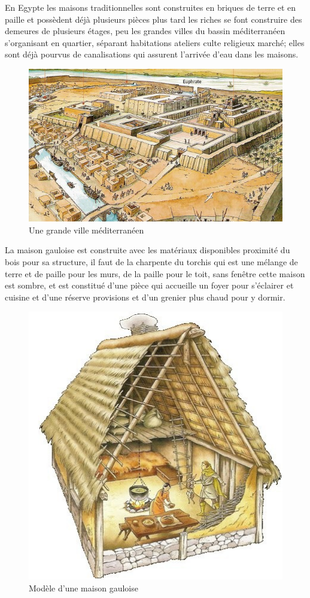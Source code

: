 En Egypte les maisons traditionnelles sont construites en briques de terre et en paille et possèdent déjà  plusieurs pièces plus tard les riches se font construire des demeures de plusieurs étages, peu les grandes villes du bassin méditerranéen s'organisant en quartier, séparant  habitations ateliers culte religieux marché; elles sont déjà pourvus de canalisations qui assurent l'arrivée d'eau dans les maisons.

\begin{figure}[H]
    \centering
    \includegraphics[scale=0.8]{chap1/chap34.png}
   \caption{Une grande ville  méditerranéen}
    \label{chap34}
\end{figure}

La maison gauloise est construite avec les matériaux disponibles proximité du bois pour sa structure, il faut de la charpente du torchis qui est une mélange de terre et de paille pour les murs, de la paille pour le toit, sans fenêtre cette maison est sombre, et est constitué d'une pièce qui accueille un foyer pour s'éclairer et cuisine et d'une réserve  provisions et d'un grenier plus chaud pour y dormir.


\begin{figure}[H]
    \centering
    \includegraphics[scale=0.7]{chap1/chap35.png}
   \caption{Modèle d'une maison gauloise}
    \label{chap35}
\end{figure}


